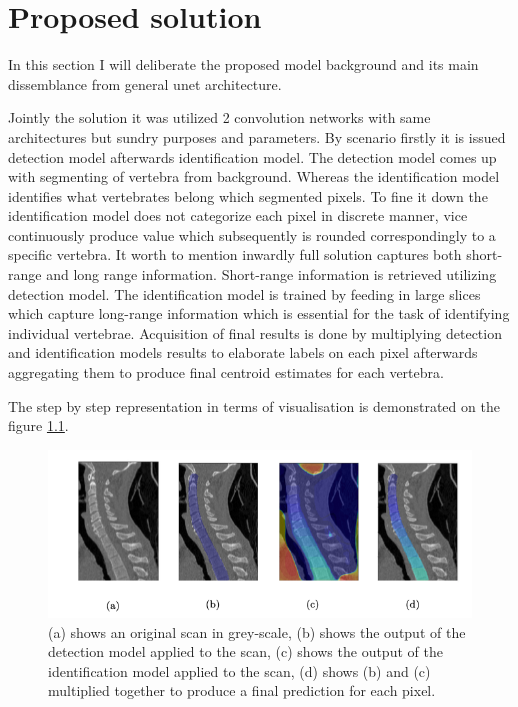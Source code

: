 \chapter{Proposed solution}
\label{ch:proposed_solution}
In this section I will deliberate the proposed model background and its main dissemblance from general unet architecture.

Jointly the solution it was utilized 2 convolution networks with same architectures but sundry purposes and parameters. By scenario firstly it is issued detection model afterwards identification model. The detection model comes up with segmenting of vertebra from background. Whereas the identification model identifies what vertebrates belong which segmented pixels. To fine it down the identification model does not categorize each pixel in discrete manner, vice continuously produce value which subsequently is rounded correspondingly to a specific vertebra. It worth to mention inwardly full solution captures both short-range and long range information. Short-range information is retrieved utilizing detection model. The identification model is trained by feeding in large slices which capture long-range information which is essential for the task of identifying individual vertebrae. Acquisition of final results is done by multiplying detection and identification models results to elaborate labels on each pixel afterwards aggregating them to produce final centroid estimates for each vertebra.

The step by step representation in terms of visualisation is demonstrated on the figure \ref{fig:detection_identification_steps}.

\begin{figure}[h]
    \centering \includegraphics[width=12cm]{images/detection_identification_steps.png}
    \caption {(a) shows an original scan in grey-scale, (b) shows the output of the detection model applied to the scan, (c) shows the output of the identification model applied to the scan, (d) shows (b) and (c) multiplied together to produce a final prediction for each pixel.}
    \label{fig:detection_identification_steps}
\end{figure}

